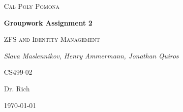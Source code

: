 \documentclass[letterpaper,12pt,titlepage]{article}
\date{Monday, March 7th 2016}
\author{Slava Maslennikov \and Henry Ammermann \and Jonathan Quiros}
\begin{document}

\begin{titlepage}
\centering
{\scshape\LARGE Cal Poly Pomona\par}
\vspace{1cm}
{\bfseries Groupwork Assignment 2\par}
\vspace{1.5cm}
{\scshape\Large ZFS and Identity Management\par}
\vspace{2cm}
{\Large\itshape Slava Maslennikov, Henry Ammermann, Jonathan Quiros\par}
\vfill
CS499-02\par
Dr. Rich
\vfill
{\large \today\par}
\end{titlepage}

\newpage
\tableofcontents
\newpage








\end{document}
